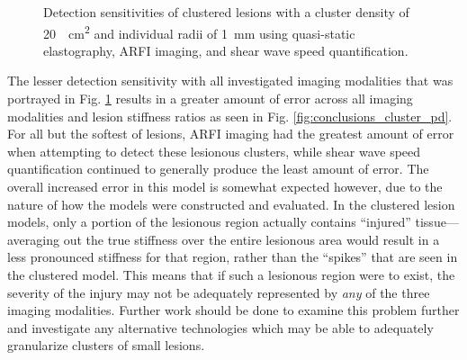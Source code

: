 			\begin{figure}[!htb]
				\centering
				\caption[Detection sensitivities of clustered lesions using the three investigated imaging modalities]{Detection sensitivities of clustered lesions with a cluster density of \SI{20}{\per\cm\squared} and individual radii of \SI{1}{\mm} using quasi-static elastography, ARFI imaging, and shear wave speed quantification.}
				\label{fig:conclusion_cluster}
			\end{figure}

			The lesser detection sensitivity with all investigated imaging modalities that was portrayed in Fig. \ref{fig:conclusion_cluster} results in a greater amount of error across all imaging modalities and lesion stiffness ratios as seen in Fig. \ref{fig:conclusions_cluster_pd}. For all but the softest of lesions, ARFI imaging had the greatest amount of error when attempting to detect these lesionous clusters, while shear wave speed quantification continued to generally produce the least amount of error. The overall increased error in this model is somewhat expected however, due to the nature of how the models were constructed and evaluated. In the clustered lesion models, only a portion of the lesionous region actually contains ``injured'' tissue---averaging out the true stiffness over the entire lesionous area would result in a less pronounced stiffness for that region, rather than the ``spikes'' that are seen in the clustered model. This means that if such a lesionous region were to exist, the severity of the injury may not be adequately represented by \emph{any} of the three imaging modalities. Further work should be done to examine this problem further and investigate any alternative technologies which may be able to adequately granularize clusters of small lesions.


